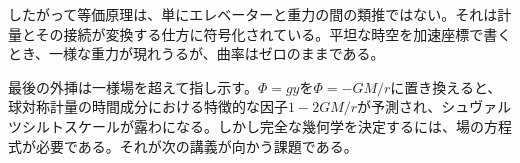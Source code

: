 したがって等価原理は、単にエレベーターと重力の間の類推ではない。それは計量とその接続が変換する仕方に符号化されている。平坦な時空を加速座標で書くとき、一様な重力が現れうるが、曲率はゼロのままである。

最後の外挿は一様場を超えて指し示す。\(\Phi=gy\)を\(\Phi=-GM/r\)に置き換えると、球対称計量の時間成分における特徴的な因子\(1-2GM/r\)が予測され、シュヴァルツシルトスケールが露わになる。しかし完全な幾何学を決定するには、場の方程式が必要である。それが次の講義が向かう課題である。
